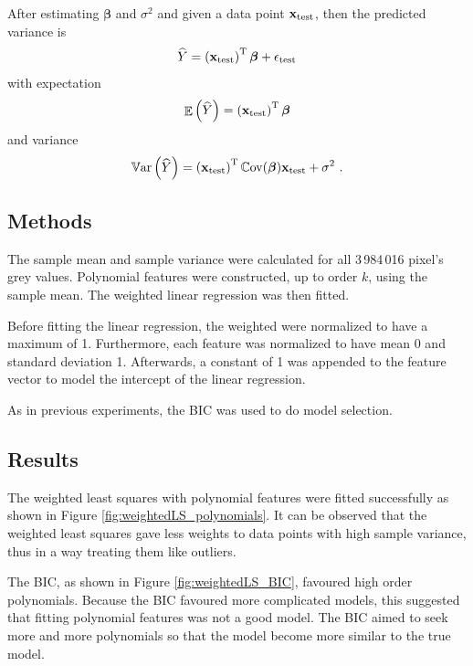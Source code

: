 \documentclass[12pt]{report}
\DeclareMathOperator{\expectation}{\mathbb{E}}
\DeclareMathOperator{\variance}{\mathbb{V}ar}
\DeclareMathOperator{\cov}{\mathbb{C}ov}
\newcommand{\T}{^\textup{T}}
\newcommand{\vect}[1]{\mathbf{#1}}
\newcommand{\vectGreek}[1]{\boldsymbol{#1}}
\begin{document}
After estimating $\vectGreek{\beta}$ and $\sigma^2$ and given a data point $\vect{x}_{\textup{test}}$, then the predicted variance is
\begin{equation}
\widehat{Y}=\left(\vect{x}_{\textup{test}}\right)\T\vectGreek{\beta} + \epsilon_{\textup{test}}
\end{equation}
with expectation
\begin{equation}
\expectation\left({\widehat{Y}}\right)=\left(\vect{x}_{\textup{test}}\right)\T\vectGreek{\beta}
\end{equation}
and variance
\begin{equation}
\variance\left(\widehat{Y}\right)=\left(\vect{x}_{\textup{test}}\right)\T\cov(\vectGreek{\beta})\vect{x}_{\textup{test}}+\sigma^2 \ .
\end{equation}

\subsection{Methods}
The sample mean and sample variance were calculated for all 3\,984\,016 pixel's grey values. Polynomial features were constructed, up to order $k$, using the sample mean. The weighted linear regression was then fitted.

Before fitting the linear regression, the weighted were normalized to have a maximum of 1. Furthermore, each feature was normalized to have mean 0 and standard deviation 1. Afterwards, a constant of 1 was appended to the feature vector to model the intercept of the linear regression.

As in previous experiments, the BIC was used to do model selection.

\subsection{Results}
The weighted least squares with polynomial features were fitted successfully as shown in Figure \ref{fig:weightedLS_polynomials}. It can be observed that the weighted least squares gave less weights to data points with high sample variance, thus in a way treating them like outliers.

The BIC, as shown in Figure \ref{fig:weightedLS_BIC}, favoured high order polynomials. Because the BIC favoured more complicated models, this suggested that fitting polynomial features was not a good model. The BIC aimed to seek more and more polynomials so that the model become more similar to the true model. 
\end{document}
